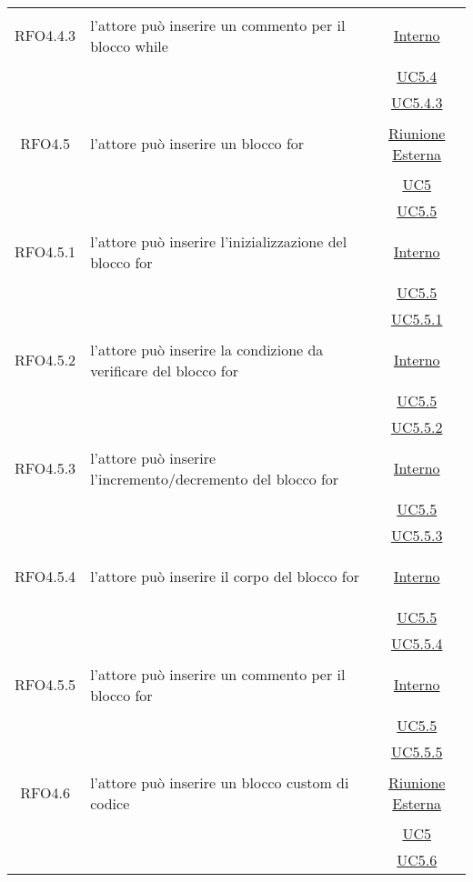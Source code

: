 \begin{longtable}{|c|>{\centering}m{7cm}|c|}
\hypertarget{RFO4.4.3}{RFO4.4.3} & l'attore può inserire un commento per il blocco while & \hyperlink{Interno}{Interno}\\
& &\hyperref[UC5.4]{UC5.4}\\
& &\hyperref[UC5.4.3]{UC5.4.3}\\ \hline

\hypertarget{RFO4.5}{RFO4.5} & l'attore può inserire un blocco for &  \hyperlink{Riunione Esterna}{Riunione Esterna}\\
& &\hyperref[UC5]{UC5}\\
& &\hyperref[UC5.5]{UC5.5}\\ \hline

\hypertarget{RFO4.5.1}{RFO4.5.1} & l'attore può inserire l'inizializzazione del blocco for & \hyperlink{Interno}{Interno}\\
& &\hyperref[UC5.5]{UC5.5}\\
& &\hyperref[UC5.5.1]{UC5.5.1}\\ \hline

\hypertarget{RFO4.5.2}{RFO4.5.2} & l'attore può inserire la condizione da verificare del blocco for & \hyperlink{Interno}{Interno}\\
& &\hyperref[UC5.5]{UC5.5}\\
& &\hyperref[UC5.5.2]{UC5.5.2}\\ \hline

\hypertarget{RFO4.5.3}{RFO4.5.3} & l'attore può inserire l'incremento/decremento del blocco for & \hyperlink{Interno}{Interno}\\
& &\hyperref[UC5.5]{UC5.5}\\
& &\hyperref[UC5.5.3]{UC5.5.3}\\ \hline

\hypertarget{RFO4.5.4}{RFO4.5.4} & l'attore può inserire il corpo del blocco for &\hyperlink{Interno}{Interno}\\
& &\hyperref[UC5.5]{UC5.5}\\
& &\hyperref[UC5.5.4]{UC5.5.4}\\ \hline

\hypertarget{RFO4.5.5}{RFO4.5.5} & l'attore può inserire un commento per il blocco for & \hyperlink{Interno}{Interno}\\
& &\hyperref[UC5.5]{UC5.5}\\
& &\hyperref[UC5.5.5]{UC5.5.5}\\ \hline

\hypertarget{RFO4.6}{RFO4.6} & l'attore può inserire un blocco custom di codice & \hyperlink{Riunione Esterna}{Riunione Esterna}\\
& &\hyperref[UC5]{UC5}\\
& &\hyperref[UC5.6]{UC5.6}\\ \hline


\end{longtable}
